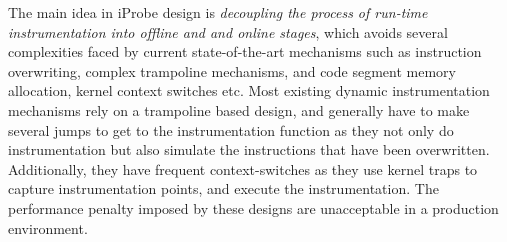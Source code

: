 



The main idea in iProbe design is \emph{decoupling the process of run-time instrumentation into offline and and online stages}, which avoids several complexities faced by current state-of-the-art mechanisms \cite{dtrace,systemtap,dyninst,pin} such as instruction overwriting, complex trampoline mechanisms, and code segment memory allocation, kernel context switches etc.
Most existing dynamic instrumentation mechanisms rely on a trampoline based design, and generally have to make several jumps to get to the instrumentation function as they not only do instrumentation but also simulate the instructions that have been overwritten.
Additionally, they have frequent context-switches as they use kernel traps to capture instrumentation points, and execute the instrumentation.
The performance penalty imposed by these designs are unacceptable in a production environment.


